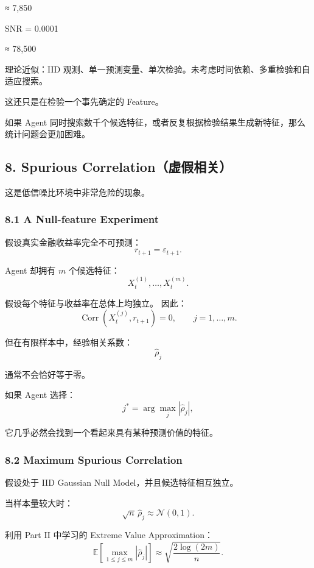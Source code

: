 ≈ 7,850

SNR = 0.0001

≈ 78,500

理论近似：IID 观测、单一预测变量、单次检验。未考虑时间依赖、多重检验和自适应搜索。

这还只是在检验一个事先确定的 Feature。

如果 Agent 同时搜索数千个候选特征，或者反复根据检验结果生成新特征，那么统计问题会更加困难。

\hypertarget{part-4-60-0001-spurious-correlationux865aux5047ux76f8ux5173}{%
\subsection{8. Spurious Correlation（虚假相关）}\label{part-4-60-0001-spurious-correlationux865aux5047ux76f8ux5173}}

这是低信噪比环境中非常危险的现象。

\hypertarget{part-4-60-0001-a-null-feature-experiment}{%
\subsubsection{8.1 A Null-feature Experiment}\label{part-4-60-0001-a-null-feature-experiment}}

假设真实金融收益率完全不可预测：
\[r_{t+1}
=
\varepsilon_{t+1}.\]

Agent 却拥有 \(m\) 个候选特征：
\[X_t^{(1)},\ldots,X_t^{(m)}.\]

假设每个特征与收益率在总体上均独立。 因此：
\[\operatorname{Corr}(X_t^{(j)},r_{t+1})=0,
\qquad j=1,\ldots,m.\]

但在有限样本中，经验相关系数：
\[\hat\rho_j\]

通常不会恰好等于零。

如果 Agent 选择：
\[j^*=\arg\max_j|\hat\rho_j|,\]

它几乎必然会找到一个看起来具有某种预测价值的特征。

\hypertarget{part-4-60-0001-maximum-spurious-correlation}{%
\subsubsection{8.2 Maximum Spurious Correlation}\label{part-4-60-0001-maximum-spurious-correlation}}

假设处于 IID Gaussian Null Model，并且候选特征相互独立。

当样本量较大时：
\[\sqrt n\,\hat\rho_j
\approx\mathcal N(0,1).\]

利用 Part II 中学习的 Extreme Value Approximation：
\[\boxed{
\mathbb E\left[
\max_{1\leq j\leq m}
|\hat\rho_j|
\right]
\approx
\sqrt{\frac{2\log(2m)}{n}}.
}\]

